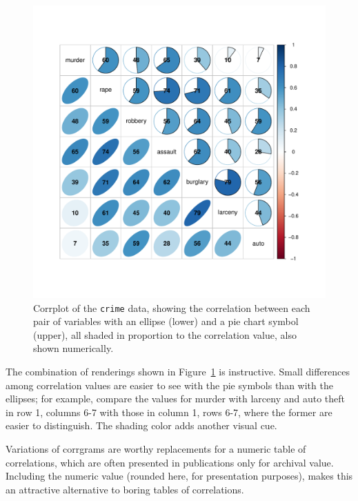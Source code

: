 \documentclass[
  letterpaper,
  10pt,
  krantz2]{krantz}
\begin{document}
\begin{figure}[H]

{\centering \includegraphics[width=1\textwidth,height=\textheight]{figs/ch03/fig-crime-corrplot-1.pdf}

}

\caption{\label{fig-crime-corrplot}Corrplot of the \texttt{crime} data,
showing the correlation between each pair of variables with an ellipse
(lower) and a pie chart symbol (upper), all shaded in proportion to the
correlation value, also shown numerically.}

\end{figure}

The combination of renderings shown in Figure~\ref{fig-crime-corrplot}
is instructive. Small differences among correlation values are easier to
see with the pie symbols than with the ellipses; for example, compare
the values for murder with larceny and auto theft in row 1, columns 6-7
with those in column 1, rows 6-7, where the former are easier to
distinguish. The shading color adds another visual cue.

Variations of corrgrams are worthy replacements for a numeric table of
correlations, which are often presented in publications only for
archival value. Including the numeric value (rounded here, for
presentation purposes), makes this an attractive alternative to boring
tables of correlations.
\end{document}
